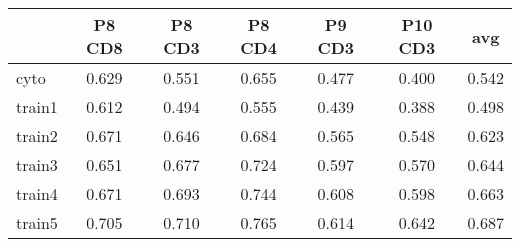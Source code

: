 \documentclass{article}
\begin{document}
\begin{tabular}{lcccccc}
   \hline  &P8 CD8& P8 CD3& P8 CD4& P9 CD3& P10 CD3& avg\\ 
\hline
cyto & 0.629 & 0.551 & 0.655 & 0.477 & 0.400 & 0.542 \\ 
  train1 & 0.612 & 0.494 & 0.555 & 0.439 & 0.388 & 0.498 \\ 
  train2 & 0.671 & 0.646 & 0.684 & 0.565 & 0.548 & 0.623 \\ 
  train3 & 0.651 & 0.677 & 0.724 & 0.597 & 0.570 & 0.644 \\ 
  train4 & 0.671 & 0.693 & 0.744 & 0.608 & 0.598 & 0.663 \\ 
  train5 & 0.705 & 0.710 & 0.765 & 0.614 & 0.642 & 0.687 \\ 
   \hline
\end{tabular}
\end{document}
